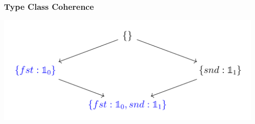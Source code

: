\documentclass{beamer}
\newcommand\Singleton[1]{\mathbb{1}_#1}
\begin{document}
\begin{frame}
  \frametitle{Type Class Coherence}



  \includegraphics[width=\textwidth]{images/lower_set.png}


\end{frame}
\end{document}
